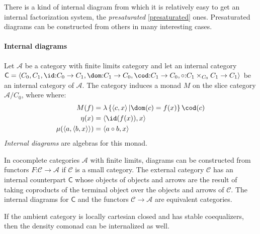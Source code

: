 \documentclass{tac}
\newcommand\keyword[1]{\emph{#1}\label{#1}}
\newcommand\cat\mathcal
\newcommand\icat\mathsf
\newcommand\of{\mathord:}
\newcommand\set[1]{\left\{#1\right\}}
\newcommand\tuplet[1]{\left\langle #1 \right\rangle}
\begin{document}
There is a kind of internal diagram from which it is relatively easy to get an internal factorization system, the \emph{presaturated} \ref{presaturated} ones. %
Presaturated diagrams can be constructed from others in many interesting cases. %

\paragraph{Internal diagrams}
\begin{definition} Let $\cat A$ be a category with finite limits category and let an internal category $\icat C = \tuplet{C_0,C_1,\id\of C_0\to C_1,\dom\of C_1\to C_0,\cod\of C_1\to C_0,\circ\of C_1\times_{C_0}C_1\to C_1}$ be an internal category of $\cat A$. 
The category induces a monad $M$ on the slice category $\cat A/C_0$, where where:
\begin{align*}
M(f) &= \lambda\set{\tuplet{c,x}| \dom(c)=f(x)}\cod(c) \\
\eta(x) &= \tuplet{\id(f(x)),x}\\
\mu(\tuplet{a,\tuplet{b,x}}) &= \tuplet{a\circ b,x}
\end{align*}
\keyword{Internal diagrams} are algebras for this monad.
\end{definition}

\begin{example}
In cocomplete categories $\cat A$ with finite limits, diagrams can be constructed from functors $F\of\cat C\to\cat A$ if $\cat C$ is a small category. The external category $\cat C$ has an internal counterpart $\icat C$ whose objects of objects and arrows are the result of taking coproducts of the terminal object over the objects and arrows of $\cat C$. The internal diagrams for $\icat C$ and the functors $\cat C\to \cat A$ are equivalent categories.
\end{example}

If the ambient category is locally cartesian closed and has stable coequalizers, then the density comonad can be internalized as well.
\end{document}
